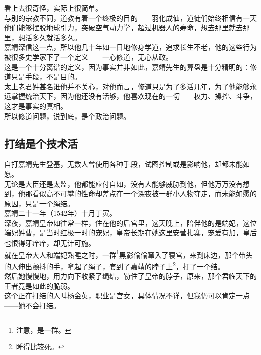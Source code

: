 \begin{multicols}{\theparacolNo}
看上去很奇怪，实际上很简单。\\

与别的宗教不同，道教有着一个终极的目的——羽化成仙，道徒们始终相信有一天他们能够摆脱地球引力，突破空气动力学，超过机器人的寿命，想去那里就去那里，想活多久就活多久。\\

嘉靖深信这一点，所以他几十年如一日地修身学道，追求长生不老，他的这些行为被很多史学家下了一个定义——一心修道，无心从政。\\

这是一个十分离谱的定义，因为事实并非如此，嘉靖先生的算盘是十分精明的：修道只是手段，不是目的。\\

太上老君姓甚名谁他并不关心，对他而言，修道只是为了多活几年，为了他能够永远掌握统治天下，因为他还没有活够，他喜欢现在的一切——权力、操控、斗争，这才是事实的真相。\\

所以修道问题，说到底，是个政治问题。\\

\subsection{打结是个技术活}
自打嘉靖先生登基，无数人曾使用各种手段，试图控制或是影响他，却都未能如愿。\\

无论是大臣还是太监，他都能应付自如，没有人能够威胁到他，但他万万没有想到，他那看似高不可攀的性命却差点在一个深夜被一群小人物夺走，而未能如愿的原因，只是一个绳结。\\

嘉靖二十一年（1542年）十月丁寅。\\

深夜，嘉靖皇帝如往常一样，住在他的后宫里，这天晚上，陪伴他的是端妃，这位端妃姓曹，是当时红极一时的宠妃，皇帝长期在她这里安营扎寨，宠爱有加，皇后也恨得牙痒痒，却无计可施。\\

就在皇帝大人和端妃熟睡之时，一群\footnote{注意，是一群。}黑影偷偷窜入了寝宫，来到床边，那个带头的人伸出颤抖的手，拿起了绳子，套到了嘉靖的脖子上\footnote{睡得比较死。}，打了一个结。\\

然后她慢慢地，用力向下收紧了绳结，勒住了皇帝的脖子，原来，那个君临天下的王者竟是如此的脆弱。\\

这个正在打结的人叫杨金英，职业是宫女，具体情况不详，但我仍可以肯定一点——她不会打结。\\


\end{multicols}
